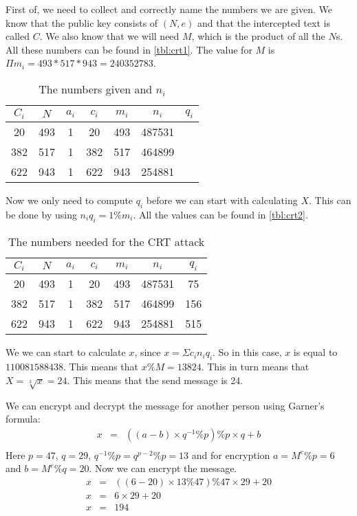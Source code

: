 First of, we need to collect and correctly name the numbers we are given. We know that the public key consists of $(N,e)$ and that the intercepted text is called $C$. We also know that we will need $M$, which is the product of all the $N$s. All these numbers can be found in \autoref{tbl:crt1}. The value for $M$ is $\Pi m_i = 493 * 517 * 943 = 240352783$.

\begin{table}[!htp]
\centering
\caption{The numbers given and $n_i$}
\label{tbl:crt1}
\begin{tabular}{|ccccccc|}
\hline
$C_i$ & $N$ & $a_i$ & $c_i$ & $m_i$ & $n_i$  & $q_i$ \\ \hline
   20 & 493 &     1 &    20 &   493 & 487531 &       \\
  382 & 517 &     1 &   382 &   517 & 464899 &       \\
  622 & 943 &     1 &   622 &   943 & 254881 &       \\ \hline
\end{tabular}
\end{table}

Now we only need to compute $q_i$ before we can start with calculating $X$. This can be done by using $n_iq_i = 1 \% m_i$. All the values can be found in \autoref{tbl:crt2}.

\begin{table}[!htp]
\centering
\caption{The numbers needed for the CRT attack}
\label{tbl:crt2}
\begin{tabular}{|ccccccc|}
\hline
$C_i$ & $N$ & $a_i$ & $c_i$ & $m_i$ & $n_i$  & $q_i$ \\ \hline
   20 & 493 &     1 &    20 &   493 & 487531 &    75 \\
  382 & 517 &     1 &   382 &   517 & 464899 &   156 \\
  622 & 943 &     1 &   622 &   943 & 254881 &   515 \\ \hline
\end{tabular}
\end{table}

We we can start to calculate $x$, since $x=\Sigma c_in_iq_i$. So in this case, $x$ is equal to $110081588438$. This means that $x\%M = 13824$. This in turn means that $X = \sqrt[3]{x} = 24$. This means that the send message is 24. 

We can encrypt and decrypt the message for another person using Garner's formula:
\[\begin{array}{lcl}
x &=& ((a - b) \times q^{-1} \% p) \% p \times q + b\\
\end{array}\]
Here $p = 47$, $q = 29$, $q^{-1} \%p = q^{p-2} \% p = 13$ and for encryption $a = M^e \% p = 6$ and $b = M^e \% q = 20$. Now we can encrypt the message. 
\[\begin{array}{lcl}
x &=& ((6 - 20) \times 13 \% 47) \% 47 \times 29 + 20 \\
x &=& 6 \times 29 + 20 \\
x &=& 194 \\
\end{array}\]

